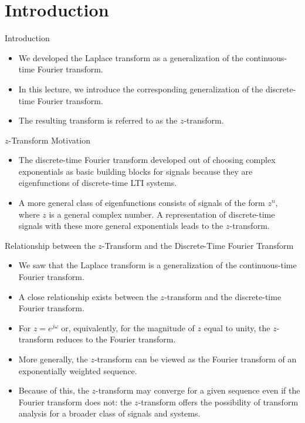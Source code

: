 \section{Introduction}
\begin{frame}{Introduction}
    \begin{itemize}
        \item We developed the Laplace transform as a generalization of the continuous-time Fourier transform.
        \item In this lecture, we introduce the corresponding generalization of the discrete-time Fourier transform.
        \item The resulting transform is referred to as the $z$-transform.
    \end{itemize}
\end{frame}


\begin{frame}{$z$-Transform Motivation}
    \begin{itemize}
        \item The discrete-time Fourier transform developed out of choosing complex exponentials as basic building blocks for signals because they are eigenfunctions of discrete-time LTI systems.
        \item A more general class of eigenfunctions consists of signals of the form $z^n$, where $z$ is a general complex number. A representation of discrete-time signals with these more general exponentials leads to the $z$-transform.
    \end{itemize}
\end{frame}

\begin{frame}{Relationship between the $z$-Transform and the Discrete-Time Fourier Transform}
    \begin{itemize}
        \item We saw that the Laplace transform is a generalization of the continuous-time Fourier transform.
        \item A close relationship exists between the $z$-transform and the discrete-time Fourier transform.
        \item For $z = e^{j\omega}$ or, equivalently, for the magnitude of $z$ equal to unity, the $z$-transform reduces to the Fourier transform.
        \item More generally, the $z$-transform can be viewed as the Fourier transform of an exponentially weighted sequence.
        \item Because of this, the $z$-transform may converge for a given sequence even if the Fourier transform does not: the $z$-transform offers the possibility of transform analysis for a broader class of signals and systems.
    \end{itemize}
\end{frame}

